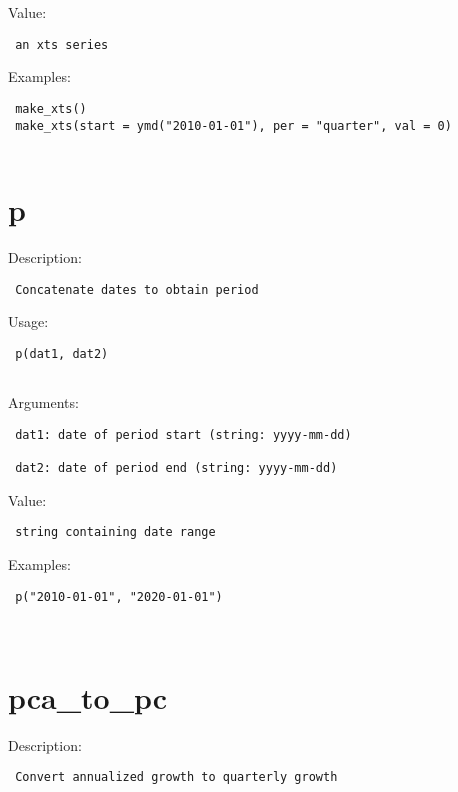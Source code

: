 \documentclass[
  letterpaper,
  DIV=11,
  numbers=noendperiod]{scrreport}
\begin{document}
Value:

\begin{verbatim}
 an xts series
\end{verbatim}

Examples:

\begin{verbatim}
 make_xts()
 make_xts(start = ymd("2010-01-01"), per = "quarter", val = 0)
 
\end{verbatim}

\section{p}\label{p}

Description:

\begin{verbatim}
 Concatenate dates to obtain period
\end{verbatim}

Usage:

\begin{verbatim}
 p(dat1, dat2)
 
\end{verbatim}

Arguments:

\begin{verbatim}
 dat1: date of period start (string: yyyy-mm-dd)

 dat2: date of period end (string: yyyy-mm-dd)
\end{verbatim}

Value:

\begin{verbatim}
 string containing date range
\end{verbatim}

Examples:

\begin{verbatim}
 p("2010-01-01", "2020-01-01")
 
 
\end{verbatim}

\section{pca\_to\_pc}\label{pca_to_pc}

Description:

\begin{verbatim}
 Convert annualized growth to quarterly growth
\end{verbatim}
\end{document}

